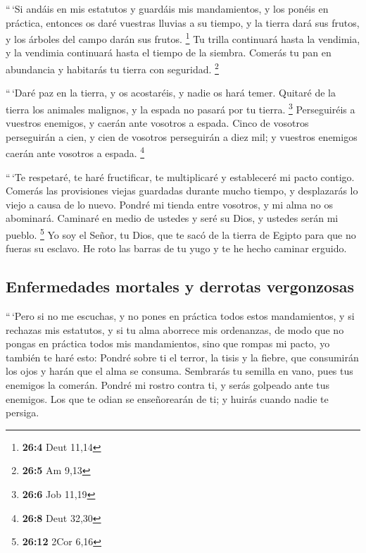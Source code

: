  ``\,`Si andáis en mis estatutos y guardáis mis
mandamientos, y los ponéis en práctica,  entonces os daré
vuestras lluvias a su tiempo, y la tierra dará sus frutos, y los árboles
del campo darán sus frutos. \footnote{\textbf{26:4} Deut 11,14}
 Tu trilla continuará hasta la vendimia, y la vendimia
continuará hasta el tiempo de la siembra. Comerás tu pan en abundancia y
habitarás tu tierra con seguridad. \footnote{\textbf{26:5} Am 9,13}

 ``\,`Daré paz en la tierra, y os acostaréis, y nadie os
hará temer. Quitaré de la tierra los animales malignos, y la espada no
pasará por tu tierra. \footnote{\textbf{26:6} Job 11,19} 
Perseguiréis a vuestros enemigos, y caerán ante vosotros a espada.
 Cinco de vosotros perseguirán a cien, y cien de vosotros
perseguirán a diez mil; y vuestros enemigos caerán ante vosotros a
espada. \footnote{\textbf{26:8} Deut 32,30}

 ``\,`Te respetaré, te haré fructificar, te multiplicaré y
estableceré mi pacto contigo.  Comerás las provisiones
viejas guardadas durante mucho tiempo, y desplazarás lo viejo a causa de
lo nuevo.  Pondré mi tienda entre vosotros, y mi alma no
os abominará.  Caminaré en medio de ustedes y seré su
Dios, y ustedes serán mi pueblo. \footnote{\textbf{26:12} 2Cor 6,16}
 Yo soy el Señor, tu Dios, que te sacó de la tierra de
Egipto para que no fueras su esclavo. He roto las barras de tu yugo y te
he hecho caminar erguido.

\hypertarget{enfermedades-mortales-y-derrotas-vergonzosas}{%
\subsection{Enfermedades mortales y derrotas
vergonzosas}\label{enfermedades-mortales-y-derrotas-vergonzosas}}

 ``\,`Pero si no me escuchas, y no pones en práctica
todos estos mandamientos,  y si rechazas mis estatutos, y
si tu alma aborrece mis ordenanzas, de modo que no pongas en práctica
todos mis mandamientos, sino que rompas mi pacto,  yo
también te haré esto: Pondré sobre ti el terror, la tisis y la fiebre,
que consumirán los ojos y harán que el alma se consuma. Sembrarás tu
semilla en vano, pues tus enemigos la comerán.  Pondré mi
rostro contra ti, y serás golpeado ante tus enemigos. Los que te odian
se enseñorearán de ti; y huirás cuando nadie te persiga.

